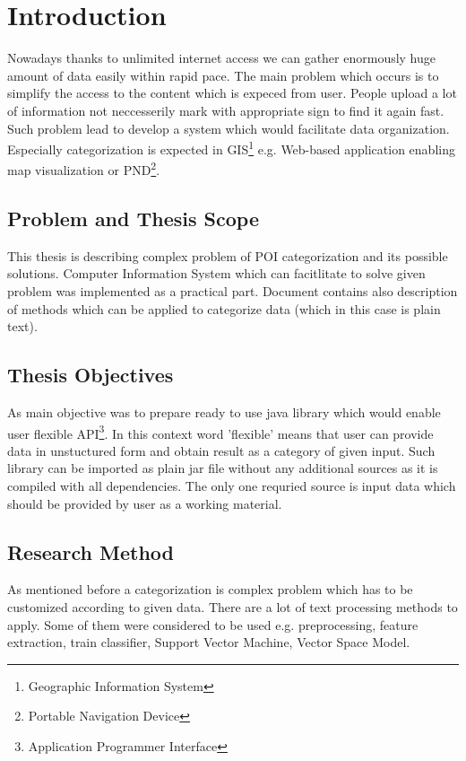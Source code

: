 \chapter{Introduction} \label{chap.introduction} 
{Nowadays thanks to unlimited internet access we can gather enormously huge amount of data easily within rapid pace. The main problem which occurs is to simplify the access to the content which is expeced from user. People upload a lot of information not neccesserily mark with appropriate sign to find it again fast. Such problem lead to develop a system which would facilitate data organization. Especially categorization is expected in GIS\footnote{Geographic Information System} e.g. Web-based application enabling map visualization or PND\footnote{Portable Navigation Device}.

}


\section{Problem and Thesis Scope}
This thesis is describing complex problem of POI categorization and its possible solutions. Computer Information System which can facitlitate to solve given problem was implemented as a practical part. Document contains also description of methods which can be applied to categorize data (which in this case is plain text). 

\section{Thesis Objectives}
As main objective was to prepare ready to use java library which would enable user flexible API\footnote{Application Programmer Interface}. In this context word 'flexible' means that user can provide data in unstuctured form and obtain result as a category of given input. Such library can be imported as plain jar file without any additional sources as it is compiled with all dependencies. The only one requried source is input data which should be provided by user as a working material. 

\section{Research Method}
As mentioned before a categorization is complex problem which has to be customized according to given data. There are a lot of text processing methods to apply. Some of them were considered to be used e.g. preprocessing, feature extraction, train classifier, Support Vector Machine, Vector Space Model.

